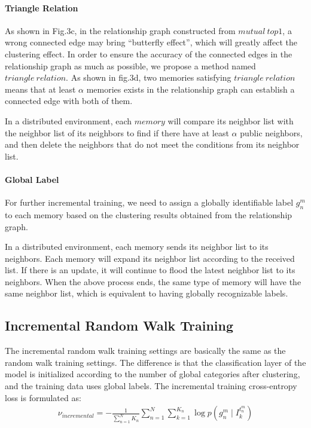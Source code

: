 \documentclass{article}
\begin{document}
\paragraph{Triangle Relation}As shown in Fig.3c, in the relationship graph constructed from $mutual \ top1$, a wrong connected edge may bring ``butterfly effect'', which will greatly affect the clustering effect. In order to ensure the accuracy of the connected edges in the relationship graph as much as possible, we propose a  method named $triangle \ relation$. As shown in fig.3d, two memories satisfying $triangle \ relation$ means that at least $\alpha$ memories exists in the relationship graph can establish a connected edge with both of them. 


In a distributed environment, each $memory$ will compare its neighbor list with the neighbor list of its neighbors to find if there have at least $\alpha$ public neighbors, and then delete the neighbors that do not meet the conditions from its neighbor list.

\paragraph{Global Label}For further incremental training, we need to assign a globally identifiable label $g_{n}^{m}$ to each memory based on the clustering results obtained from the relationship graph.


In a distributed environment, each memory sends its neighbor list to its neighbors. Each memory will expand its neighbor list according to the received list. If there is an update, it will continue to flood the latest neighbor list to its neighbors. When the above process ends, the same type of memory will have the same neighbor list, which is equivalent to having globally recognizable labels.

\subsection{Incremental Random Walk Training}
The incremental random walk training settings are basically the same as the random walk training settings. The difference is that the classification layer of the model is initialized according to the number of global categories after clustering, and the training data uses global labels. The incremental training cross-entropy loss is formulated as:
\begin{equation}
\begin{aligned}
    \nu _{incremental}=-\frac{1}{\sum_{n=1}^{N} K_{n}}\sum_{n=1}^{N}\sum_{k=1}^{K_{n}}\log p(g_{n}^{m}\mid I_{k}^{t_{n}^{m}})
\end{aligned}
\end{equation}
\end{document}

